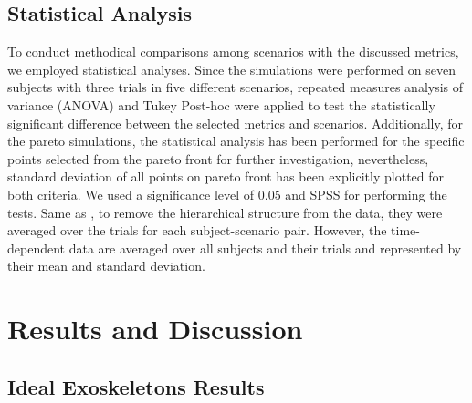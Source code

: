 \documentclass[10pt,letterpaper]{article}
\begin{document}
\subsection*{Statistical Analysis}
To conduct methodical comparisons among scenarios with the discussed metrics, we employed statistical analyses. Since the simulations were performed on seven subjects with three trials in five different scenarios, repeated measures analysis of variance (ANOVA) and Tukey Post-hoc were applied to test the statistically significant difference between the selected metrics and scenarios.  Additionally, for the pareto simulations, the statistical analysis has been performed for the specific points selected from the pareto front for further investigation, nevertheless, standard deviation of all points on pareto front has been explicitly plotted for both criteria. We used a significance level of 0.05 and SPSS \cite{spss} for performing the tests. Same as \cite{93}, to remove the hierarchical structure from the data, they were averaged over the trials for each subject-scenario pair. However, the time-dependent data are averaged over all subjects and their trials and represented by their mean and standard deviation.
\section*{Results and Discussion}
\subsection*{Ideal Exoskeletons Results}
\end{document}
